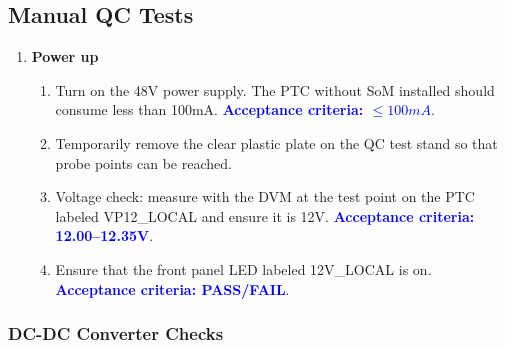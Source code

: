 \documentclass[a4paper,12pt]{article}
\begin{document}
\newpage
\subsection{Manual QC Tests}
\label{section:manual_tests}

    \begin{enumerate}
        \item \textbf{Power up}
            \begin{enumerate}
                \item Turn on the 48V power supply. The PTC without SoM installed should consume less than 100mA. \textcolor{blue}{\textbf{Acceptance criteria: $\leq 100mA$}}.
                \item Temporarily remove the clear plastic plate on the QC test stand so that probe points can be reached.
                \item Voltage check: measure with the DVM at the test point on the PTC labeled VP12\_LOCAL and ensure it is 12V. \textcolor{blue}{\textbf{Acceptance criteria: 12.00--12.35V}}.
                \item Ensure that the front panel LED labeled 12V\_LOCAL is on. \textcolor{blue}{\textbf{Acceptance criteria: PASS/FAIL}}.
            \end{enumerate}
        
    \end{enumerate}

\subsubsection{DC-DC Converter Checks}
\label{section:dcdc_check}
\end{document}
